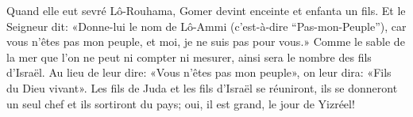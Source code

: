 Quand elle eut sevré Lô-Rouhama, Gomer devint enceinte et enfanta un fils.
Et le Seigneur dit: «Donne-lui le nom de Lô-Ammi (c’est-à-dire “Pas-mon-Peuple”),
	car vous n’êtes pas mon peuple, et moi, je ne suis pas pour vous.»
Comme le sable de la mer que l’on ne peut ni compter ni mesurer,
	ainsi sera le nombre des fils d’Israël.
Au lieu de leur dire: «Vous n’êtes pas mon peuple»,
	on leur dira: «Fils du Dieu vivant».
Les fils de Juda et les fils d’Israël se réuniront,
	ils se donneront un seul chef et ils sortiront du pays;
	oui, il est grand, le jour de Yizréel!
